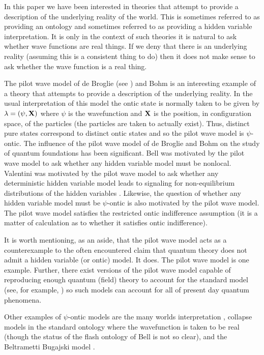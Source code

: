 \documentclass[12pt]{article}
\begin{document}
In this paper we have been interested in theories that attempt to provide a description of the underlying reality of the world.   This is sometimes referred to as providing an ontology and
sometimes referred to as providing a hidden variable interpretation.  It is only in the context of such theories it is natural to ask whether wave functions are real things.  If we deny that
there is an underlying reality (assuming this is a consistent thing to do) then it does not make sense to ask whether the wave function is a real thing.

The pilot wave model of de Broglie (see \cite{bacciagaluppi2008quantum}) and Bohm \cite{bohm1952suggested} is an interesting example of a theory that attempts to provide a description of the
underlying reality.  In the usual interpretation of this model the ontic state is normally taken to be given by $\lambda = (\psi, \bf{X})$ where $\psi$ is the wavefunction and $\bf X$ is the
position, in configuration space, of the particles (the particles are taken to actually exist).   Thus, distinct pure states correspond to distinct ontic states and so the pilot wave model
is $\psi$-ontic.  The influence of the pilot wave model of de Broglie and Bohm on the study of quantum foundations has been significant.  Bell was motivated by the pilot wave model to ask whether any hidden variable model must
be nonlocal.  Valentini was motivated by the pilot wave model to ask whether any deterministic hidden variable model leads to signaling for non-equilibrium distributions of the hidden
variables \cite{valentini2002signal}.  Likewise, the question of whether any hidden variable model must be $\psi$-ontic is also motivated by the pilot wave model.  The pilot wave model
satisfies the restricted ontic indifference assumption (it is a matter of calculation as to whether it satisfies ontic indifference).

It is worth mentioning, as an aside, that the pilot wave model acts as a counterexample to the often encountered claim that quantum theory does not admit a hidden variable (or ontic) model.
It does.  The pilot wave model is one example.  Further, there exist versions of the pilot wave model capable of reproducing enough quantum (field) theory to account for the standard model
(see, for example, \cite{struyve2007minimalist}) so such models can account for all of present day quantum phenomena.

Other examples of $\psi$-ontic models are the many worlds interpretation \cite{everett1957relative}, collapse models in the standard ontology where the wavefunction is taken to be real
\cite{pearle1976reduction, ghirardi1986unified} (though the status of the flash ontology of Bell \cite{bell2004speakable} is not so clear), and the Beltrametti Bugajski model
\cite{beltrametti1995classical}.
\end{document}
